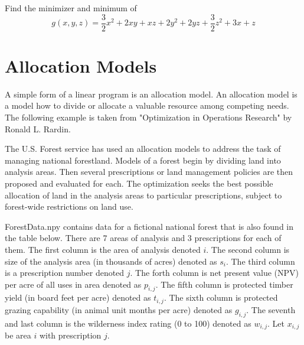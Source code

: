 \begin{problem}
Find the minimizer and minimum of
\begin{equation}
g(x,y,z) = \frac{3}{2}x^2 +2xy + xz+ 2y^2 +2yz+\frac{3}{2}z^2+3x + z
\end{equation}
\begin{comment} 
\begin{equation}
f(x) = \frac{1}{2}x^TQx - x^Tp
\end{equation}
where 

\begin{center}
$Q =
\begin{bmatrix}
3 & 2 & 1\\
2 & 4 & 2\\
1 & 2 & 3\\
\end{bmatrix}
$
and $p = 
\begin{bmatrix}
3\\
0\\
1\\
\end{bmatrix}
$
\end{center}
\end{comment}
\end{problem}
\section*{Allocation Models}
A simple form of a linear program is an allocation model. An allocation model is a model how to divide or allocate a valuable resource among competing needs. The following example is taken from "Optimization in Operations Research" by Ronald L. Rardin. %

The U.S. Forest service has used an allocation models to address the task of managing national forestland. Models of a forest begin by dividing land into analysis areas. Then several prescriptions or land management policies are then proposed and evaluated for each. The optimization seeks the best possible allocation of land in the analysis areas to particular prescriptions, subject to forest-wide restrictions on land use.

ForestData.npy contains data for a fictional national forest that is also found in the table below. There are 7 areas of analysis and 3 prescriptions for each of them. The first column is the area of analysis denoted $i$. The second column is size of the analysis area (in thousands of acres) denoted as $s_i$. The third column is a prescription number denoted $j$. The forth column is net present value (NPV) per acre of all uses in area denoted as $p_{i,j}$. The fifth column is protected timber yield (in board feet per acre) denoted as $t_{i,j}$. The sixth column is protected grazing capability (in animal unit months per acre) denoted as $g_{i,j}$. The seventh and last column is the wilderness index rating (0 to 100) denoted as $w_{i,j}$. Let $x_{i,j}$ be area $i$ with prescription $j$.

